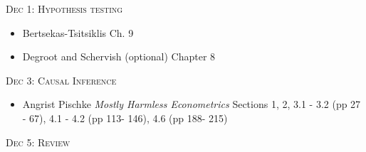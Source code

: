 \documentclass[11pt]{article}
\begin{document}
\noindent \textsc{Dec 1: Hypothesis testing}

\begin{itemize}

 \item Bertsekas-Tsitsiklis Ch. 9
  \item Degroot and Schervish (optional) Chapter 8

\end{itemize}

\noindent \textsc{Dec 3: Causal Inference}

\begin{itemize}

\item Angrist Pischke \emph{Mostly Harmless Econometrics} Sections 1, 2, 3.1 - 3.2 (pp 27 - 67), 4.1 - 4.2 (pp 113- 146), 4.6 (pp 188- 215)

\end{itemize}

\noindent \textsc{Dec 5: Review}
\end{document}
